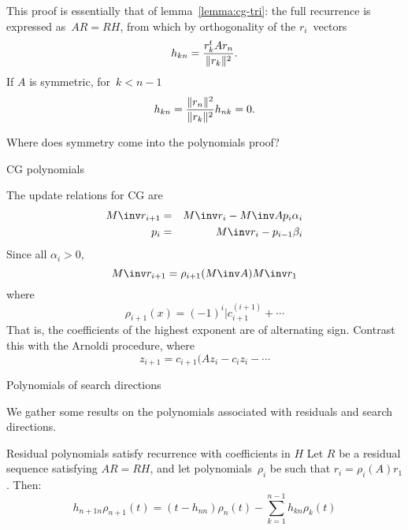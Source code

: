 \documentclass[11pt]{artikel3}
\begin{document}
\begin{Outline}
This proof is essentially that of lemma~\ref{lemma:cg-tri}: the full
recurrence is expressed as~$AR=RH$, from which by orthogonality of the
$r_i$~vectors
\[ h_{kn}={r_k^tAr_n\over \|r_k\|^2}. \]
If $A$ is symmetric, for~$k<n-1$
\[ h_{kn}={\|r_n\|^2\over \|r_k\|^2}h_{nk}=0.\]

\begin{question}
Where does symmetry come into the polynomials proof?
\end{question}

 {CG polynomials}

The update relations for CG are
\begin{eqnarray*}
M\inv r_{i+1}&=&M\inv r_i- M\inv Ap_i\alpha_i\\
p_i&=&M\inv r_i-p_{i-1}\beta_i
\end{eqnarray*}
Since all $\alpha_i>0$,
\[M\inv r_{i+1}=\rho_{i+1}(M\inv A)M\inv r_1\]
where \[ \rho_{i+1}(x)=(-1)^i|c^{(i+1)}_{i+1}+\cdots \]
That is, the coefficients of the highest exponent are of alternating
sign. Contrast this with the Arnoldi procedure, where 
\[ z_{i+1}=c_{i+1}(Az_i-c_iz_i-\cdots \]

 {Polynomials of search directions}

We gather some results on the polynomials associated with residuals
and search directions.

\begin{llemma}{Residual polynomials satisfy recurrence with 
coefficients in $H$}
\label{lemma:polynomial:recurrence}
Let $R$ be a residual sequence satisfying $AR=RH$,
and let polynomials~$\rho_i$ be such that $r_i=\rho_i(A)r_1$. Then:
\[h_{n+1n}\rho_{n+1}(t)=
  (t-h_{nn})\rho_n(t)-\sum_{k=1}^{n-1}h_{kn}\rho_k(t) \]
\end{llemma}

\begin{comment}
\begin{proof}
Let $U$ be the upper triangular matrix containing the polynomial coefficients.
From the relation $UH=JU$ relating the upper
Hessenberg matrix and the upper triangular matrix corresponding to
certain spans of Krylov spaces we see that $U$ can be solved one
column at a time. Suppose the $n$-th column $u_{*n}$ has been solved,
then 
\begin{equation}
        u_{in+1}h_{n+1n}=u_{i-1n}-\sum_{k=1}^n u_{ik}h_{kn}
        \qquad\hbox{for $i=1,\ldots,n+1$.}
        \label{eq:HtoU}\end{equation}
This relation implies the recurrence for the polynomials~$\rho_n$.
\end{proof}
\end{comment}


\end{Outline}
\end{document}
